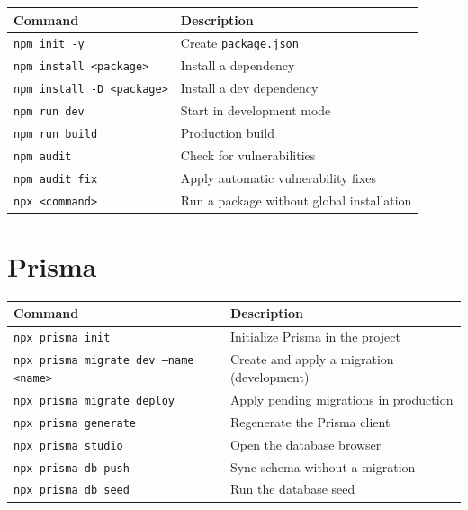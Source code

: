 \begin{center}
\begin{tabularx}{\textwidth}{l X}
\toprule
\textbf{Command} & \textbf{Description} \\
\midrule
\texttt{npm init -y} & Create \texttt{package.json} \\
\texttt{npm install <package>} & Install a dependency \\
\texttt{npm install -D <package>} & Install a dev dependency \\
\texttt{npm run dev} & Start in development mode \\
\texttt{npm run build} & Production build \\
\texttt{npm audit} & Check for vulnerabilities \\
\texttt{npm audit fix} & Apply automatic vulnerability fixes \\
\texttt{npx <command>} & Run a package without global installation \\
\bottomrule
\end{tabularx}
\end{center}

\section{Prisma}

\begin{center}
\begin{tabularx}{\textwidth}{l X}
\toprule
\textbf{Command} & \textbf{Description} \\
\midrule
\texttt{npx prisma init} & Initialize Prisma in the project \\
\texttt{npx prisma migrate dev --name <name>} & Create and apply a migration (development) \\
\texttt{npx prisma migrate deploy} & Apply pending migrations in production \\
\texttt{npx prisma generate} & Regenerate the Prisma client \\
\texttt{npx prisma studio} & Open the database browser \\
\texttt{npx prisma db push} & Sync schema without a migration \\
\texttt{npx prisma db seed} & Run the database seed \\
\bottomrule
\end{tabularx}
\end{center}

